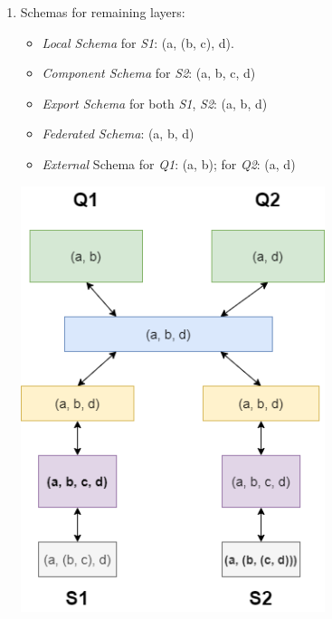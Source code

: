 \documentclass{scrartcl}
\begin{document}
\begin{enumerate}
		\item Schemas for remaining layers:
		\begin{itemize}
			\item \textit{Local Schema} for \textit{S1}: (a, (b, c), d).
			\item \textit{Component Schema} for \textit{S2}: (a, b, c, d)
			\item \textit{Export Schema} for both \textit{S1}, \textit{S2}: (a, b, d)
			\item \textit{Federated Schema}: (a, b, d)
			\item \textit{External} Schema for \textit{Q1}: (a, b); for \textit{Q2}: (a, d)
		\end{itemize}
		\begin{center}
			\includegraphics[width=0.7\textwidth]{figures/Task3_c_Visualization.png}
		\end{center}
		
	\end{enumerate}
	
\end{document}

